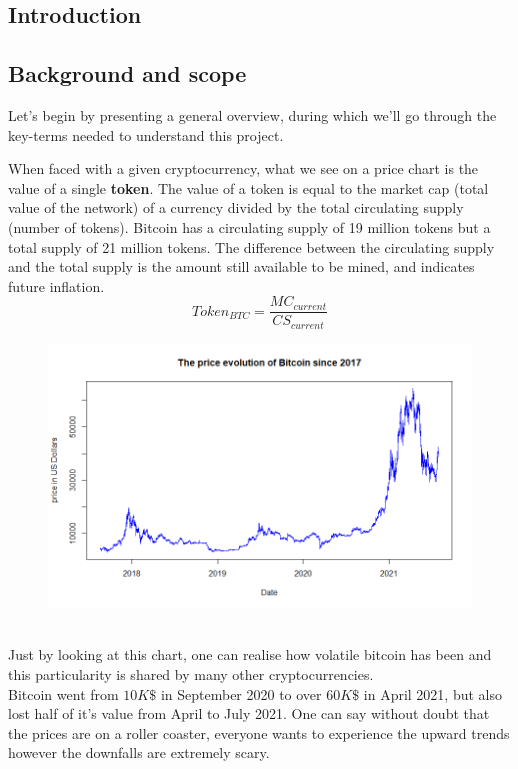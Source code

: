 \documentclass[twoside]{report}
\date{June 2021}
\begin{document}
\begin{spacing}{1}

\selectfont
\tableofcontents




\chapter{Introduction}

\section{Background and scope}
Let's begin by presenting a general overview, during which we'll go through the key-terms needed to understand this project.

When faced with a given cryptocurrency, what we see on a price chart is the value of a single \textbf{token}.
The value of a token is equal to the market cap (total value of the network) of a currency divided by the total circulating supply (number of tokens).
Bitcoin has a circulating supply of 19 million tokens but a total supply of 21 million tokens. The difference between the circulating supply and the total supply is the amount still available to be mined, and indicates future inflation. 
\[
Token_{BTC}=\frac{MC_{current}}{CS_{current}}
\]
\begin{figure}[!htbp]
    \centering
    \includegraphics[scale = 0.7]{TestPlots/BTC_overview.png}
    \caption{}
    \label{}
\end{figure}
\\
Just by looking at this chart, one can realise how volatile bitcoin has been and this particularity is shared by many other cryptocurrencies.\\
Bitcoin went from $10K\$$ in September 2020 to over $60K\$$ in April 2021, but also lost half of it's value from April to July 2021.
One can say without doubt that the prices are on a roller coaster, everyone wants to experience the upward trends however the downfalls are extremely scary.\\


\end{spacing}
\end{document}
